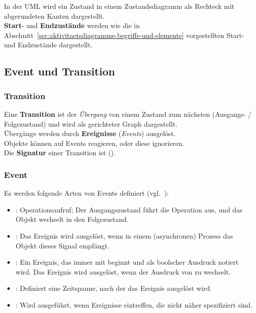 \noindent
In der UML wird ein Zustand in einem Zustandsdiagramm als Rechteck mit abgerundeten Kanten dargestellt.\\

\noindent
\textbf{Start}- und \textbf{Endzustände} werden wie die in Abschnitt~\ref{sec:aktivitaetsdiagramme-begriffe-und-elemente} vorgestellten Start- und Endzustände dargestellt.


\subsection{Event und Transition}

\subsubsection*{Transition}
Eine \textbf{Transition} ist der \textit{Übergang} von einem Zustand zum nächsten (Ausgangs- / Folgezustand) und wird als gerichteter Graph dargestellt.\\

\noindent
Übergänge werden durch \textbf{Ereignisse} (\textit{Events}) ausgelöst.\\
Objekte können auf Events reagieren, oder diese ignorieren.\\

\noindent
Die \textbf{Signatur} einer Transition ist  (\cite[321]{OMG17}).

\subsubsection*{Event}
Es werden folgende Arten von Events definiert (vgl.~\cite[69]{Buh09}):

\begin{itemize}
    \item {}: Operationsaufruf; Der Ausgangszustand führt die Operation aus, und das Objekt wechselt in den Folgezustand.
    \item {}: Das Ereignis wird ausgelöst, wenn in einem (asynchronen) Prozess das Objekt dieses Signal empfängt.
    \item {}: Ein Ereignis, das immer mit  beginnt und als boolscher Ausdruck notiert wird. Das Ereignis wird ausgelöst, wenn der Ausdruck von  zu  wechselt.
    \item {}: Definiert eine Zeitspanne, nach der das Ereignis ausgelöst wird.
    \item {}: Wird ausgeführt, wenn Ereignisse eintreffen, die nicht näher spezifiziert sind.
\end{itemize}

